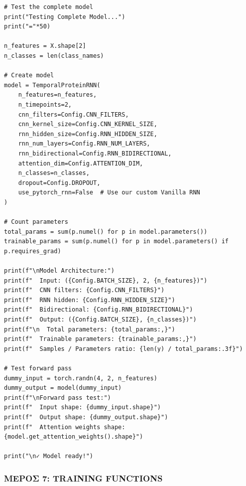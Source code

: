 \begin{lstlisting}
# Test the complete model
print("Testing Complete Model...")
print("="*50)
 
n_features = X.shape[2]
n_classes = len(class_names)
 
# Create model
model = TemporalProteinRNN(
    n_features=n_features,
    n_timepoints=2,
    cnn_filters=Config.CNN_FILTERS,
    cnn_kernel_size=Config.CNN_KERNEL_SIZE,
    rnn_hidden_size=Config.RNN_HIDDEN_SIZE,
    rnn_num_layers=Config.RNN_NUM_LAYERS,
    rnn_bidirectional=Config.RNN_BIDIRECTIONAL,
    attention_dim=Config.ATTENTION_DIM,
    n_classes=n_classes,
    dropout=Config.DROPOUT,
    use_pytorch_rnn=False  # Use our custom Vanilla RNN
)
 
# Count parameters
total_params = sum(p.numel() for p in model.parameters())
trainable_params = sum(p.numel() for p in model.parameters() if p.requires_grad)
 
print(f"\nModel Architecture:")
print(f"  Input: ({Config.BATCH_SIZE}, 2, {n_features})")
print(f"  CNN filters: {Config.CNN_FILTERS}")
print(f"  RNN hidden: {Config.RNN_HIDDEN_SIZE}")
print(f"  Bidirectional: {Config.RNN_BIDIRECTIONAL}")
print(f"  Output: ({Config.BATCH_SIZE}, {n_classes})")
print(f"\n  Total parameters: {total_params:,}")
print(f"  Trainable parameters: {trainable_params:,}")
print(f"  Samples / Parameters ratio: {len(y) / total_params:.3f}")
 
# Test forward pass
dummy_input = torch.randn(4, 2, n_features)
dummy_output = model(dummy_input)
print(f"\nForward pass test:")
print(f"  Input shape: {dummy_input.shape}")
print(f"  Output shape: {dummy_output.shape}")
print(f"  Attention weights shape: {model.get_attention_weights().shape}")
 
print("\n✓ Model ready!")
\end{lstlisting}
 
\subsubsection*{ΜΕΡΟΣ 7: TRAINING FUNCTIONS}
 
